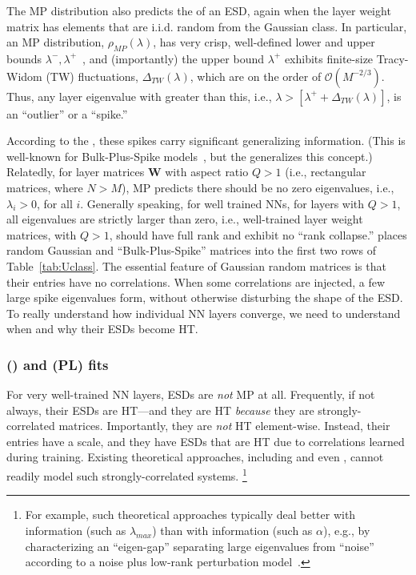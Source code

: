 The MP distribution also predicts the \SCALE of an ESD, again when the layer weight matrix has elements that are i.i.d. random from the Gaussian \Universality class.
In particular, an MP distribution, $\rho_{MP}(\lambda)$, has very crisp, well-defined lower and upper bounds $\lambda^{-},\lambda^{+}$~\cite{MM18_TR_JMLRversion}, and (importantly) the upper bound $\lambda^{+}$ exhibits finite-size Tracy-Widom (TW) fluctuations, $\Delta_{TW}(\lambda)$, which are on the order of $\mathcal{O}(M^{-2/3})$. 
Thus, any layer eigenvalue with \SCALE greater than this, i.e., $\lambda>[\lambda^{+}+\Delta_{TW}(\lambda)]$, is an ``outlier'' or a ``spike.''

According to the \HTSR \Phenomenology, these spikes carry significant generalizing information. 
(This is well-known for Bulk-Plus-Spike models~\cite{MM18_TR_JMLRversion}, but the \HTSR \Phenomenology generalizes this concept.)
%
Relatedly, for layer matrices $\mathbf{W}$ with aspect ratio $Q>1$ (i.e., rectangular matrices, where $N>M$), MP \RMT predicts there should be no zero eigenvalues, i.e., $\lambda_i>0$, for all $i$. 
Generally speaking, for well trained NNs, for layers with $Q>1$, all eigenvalues are strictly larger than zero, i.e., 
well-trained layer weight matrices, with $Q>1$, should have full rank and exhibit no ``rank collapse.'' 
\HTSR places random Gaussian and ``Bulk-Plus-Spike'' matrices into the first two rows of Table~\ref{tab:Uclass}.
The essential feature of Gaussian random matrices is that their entries have no correlations. 
When some correlations are injected, a few large spike eigenvalues form, without otherwise disturbing the shape of the ESD. 
To really understand how individual NN layers converge, we need to understand when and why their ESDs become HT.


\subsubsection{\HeavyTailed \RandomMatrixTheory (\HTRMT) and \PowerLaw (PL) fits}
\label{sxn:htsr_pl_fits}

For very well-trained NN layers, ESDs are \emph{not} MP at all.
Frequently, if not always, their ESDs are HT---and they are HT \emph{because} they are strongly-correlated matrices.  
Importantly, they are \emph{not} HT element-wise.
Instead, their entries have a scale, and they have ESDs that are HT due to correlations learned during training. 
Existing theoretical approaches, including \SLT and even \STATMECH, cannot readily model such strongly-correlated systems.%
\footnote{For example, such theoretical approaches typically deal better with \emph{\Scale} information (such as $\lambda_{max}$) than with 
\emph{\Shape} information (such as $\alpha$), e.g., by characterizing an ``eigen-gap'' separating large eigenvalues from 
``noise''~\cite{bach2006_JMLR} according to a noise plus low-rank perturbation model~\cite{BFR11}.}

